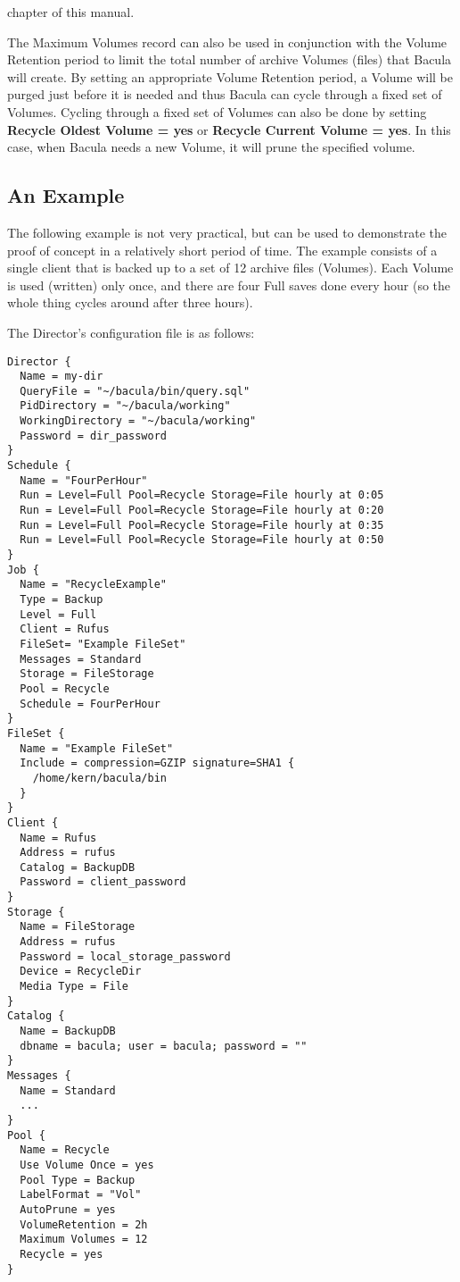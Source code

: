  chapter of
this manual. 

The Maximum Volumes record can also be used in conjunction with the Volume
Retention period to limit the total number of archive Volumes (files) that
Bacula will create. By setting an appropriate Volume Retention period, a
Volume will be purged just before it is needed and thus Bacula can cycle
through a fixed set of Volumes. Cycling through a fixed set of Volumes can
also be done by setting {\bf Recycle Oldest Volume = yes} or {\bf Recycle
Current Volume = yes}. In this case, when Bacula needs a new Volume, it will
prune the specified volume. 
\label{Example2}

\subsection*{An Example}

The following example is not very practical, but can be used to demonstrate
the proof of concept in a relatively short period of time. The example
consists of a single client that is backed up to a set of 12 archive files
(Volumes). Each Volume is used (written) only once, and there are four Full
saves done every hour (so the whole thing cycles around after three hours). 

The Director's configuration file is as follows: 

\footnotesize
\begin{verbatim}
Director {
  Name = my-dir
  QueryFile = "~/bacula/bin/query.sql"
  PidDirectory = "~/bacula/working"
  WorkingDirectory = "~/bacula/working"
  Password = dir_password
}
Schedule {
  Name = "FourPerHour"
  Run = Level=Full Pool=Recycle Storage=File hourly at 0:05
  Run = Level=Full Pool=Recycle Storage=File hourly at 0:20
  Run = Level=Full Pool=Recycle Storage=File hourly at 0:35
  Run = Level=Full Pool=Recycle Storage=File hourly at 0:50
}
Job {
  Name = "RecycleExample"
  Type = Backup
  Level = Full
  Client = Rufus
  FileSet= "Example FileSet"
  Messages = Standard
  Storage = FileStorage
  Pool = Recycle
  Schedule = FourPerHour
}
FileSet {
  Name = "Example FileSet"
  Include = compression=GZIP signature=SHA1 {
    /home/kern/bacula/bin
  }
}
Client {
  Name = Rufus
  Address = rufus
  Catalog = BackupDB
  Password = client_password
}
Storage {
  Name = FileStorage
  Address = rufus
  Password = local_storage_password
  Device = RecycleDir
  Media Type = File
}
Catalog {
  Name = BackupDB
  dbname = bacula; user = bacula; password = ""
}
Messages {
  Name = Standard
  ...
}
Pool {
  Name = Recycle
  Use Volume Once = yes
  Pool Type = Backup
  LabelFormat = "Vol"
  AutoPrune = yes
  VolumeRetention = 2h
  Maximum Volumes = 12
  Recycle = yes
}
\end{verbatim}
\normalsize

